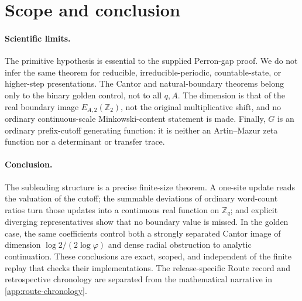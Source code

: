 \section{Scope and conclusion}
\label{sec:scope}

\paragraph{Scientific limits.}
The primitive hypothesis is essential to the supplied Perron-gap proof.
We do not infer the same theorem for reducible, irreducible-periodic,
countable-state, or higher-step presentations.  The Cantor and
natural-boundary theorems belong only to the binary golden control, not to
all \(q,A\).  The dimension is that of the real boundary image
\(E_{A,2}(\mathbb Z_2)\), not the original multiplicative shift, and no
ordinary continuous-scale Minkowski-content statement is made.  Finally,
\(G\) is an ordinary prefix-cutoff generating function: it is neither an
Artin--Mazur zeta function nor a determinant or transfer trace.

\paragraph{Conclusion.}
The subleading structure is a precise finite-size theorem.  A one-site
update reads the valuation of the cutoff;
the summable deviations of ordinary word-count ratios turn those updates
into a continuous real function on \(\mathbb Z_q\); and explicit diverging
representatives show that no boundary value is missed.  In the golden case,
the same coefficients control both a strongly separated Cantor image of
dimension \(\log2/(2\log\varphi)\) and dense radial obstruction to analytic
continuation.  These conclusions are exact, scoped, and independent of the
finite replay that checks their implementations.  The release-specific Route
record and retrospective chronology are separated from the mathematical
narrative in \cref{app:route-chronology}.
